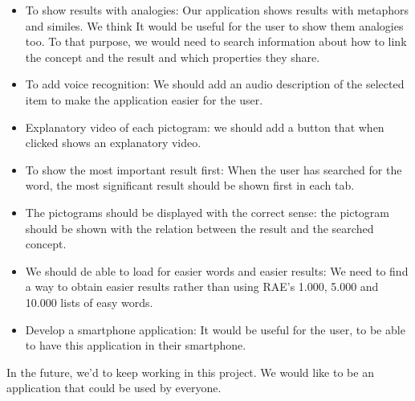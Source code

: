 \begin{itemize}
	\item To show results with analogies: Our application shows results with metaphors and similes. We think It would be useful for the user to show them analogies too. To that purpose, we would need to search information about how to link the concept and the result and which properties they share.
	
	\item To add voice recognition: We should add an audio description of the selected item to make the application easier for the user.
	
	\item Explanatory video of each pictogram: we should add a button that when clicked shows an explanatory video.
	
	\item To show the most important result first: When the user has searched for the word, the most significant result should be shown first in each tab.
	
	\item The pictograms should be displayed with the correct sense: the pictogram should be shown with the relation between the result and the searched concept.
	
	\item We should de able to load for easier words and easier results: We need to find a way to obtain easier results rather than using RAE's 1.000, 5.000 and 10.000 lists of easy words.
	
	\item Develop a smartphone application: It would be useful for the user, to be able to have this application in their smartphone.
	
\end{itemize}

In the future, we'd to keep working in this project. We would like to be an application that could be used by everyone.




